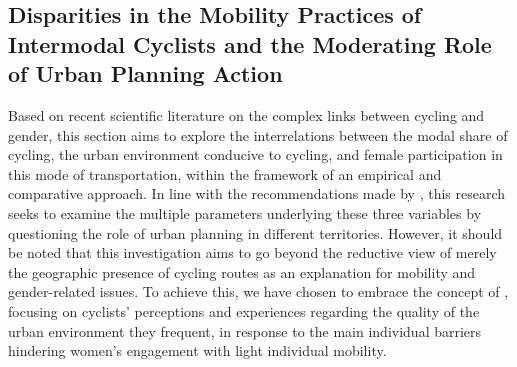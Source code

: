 \begin{refsegment}
\section{Disparities in the Mobility Practices of Intermodal Cyclists and the Moderating Role of Urban Planning Action
    \label{section-chap4:cyclabilite-genre}
    }
Based on recent scientific literature on the complex links between cycling and gender, this section aims to explore the interrelations between the modal share of cycling, the urban environment conducive to cycling, and female participation in this mode of transportation, within the framework of an empirical and comparative approach. In line with the recommendations made by \textcolor{blue}{\textcite[78]{goel_cycling_2022}}, this research seeks to examine the multiple parameters underlying these three variables by questioning the role of urban planning in different territories. However, it should be noted that this investigation aims to go beyond the reductive view of merely the geographic presence of cycling routes as an explanation for mobility and gender-related issues. To achieve this, we have chosen to embrace the concept of , focusing on cyclists' perceptions and experiences regarding the quality of the urban environment they frequent, in response to the main individual barriers hindering women's engagement with light individual mobility. %


\end{refsegment}
